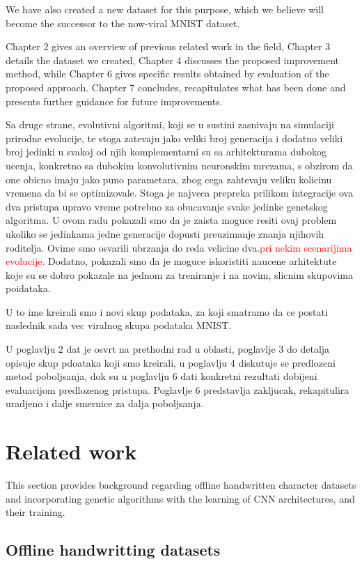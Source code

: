 \documentclass[eng]{simposium}
\begin{document}
We have also created a new dataset for this purpose, which we believe will become the successor to the now-viral MNIST dataset.

Chapter 2 gives an overview of previous related work in the field, Chapter 3 details the dataset we created,
Chapter 4 discusses the proposed improvement method, while Chapter 6 gives specific results obtained by evaluation of the proposed approach.
Chapter 7 concludes, recapitulates what has been done and presents further guidance for future improvements.

Sa druge strane, evolutivni algoritmi, koji se u sustini zasnivaju na simulaciji prirodne evolucije, te stoga zatevaju jako 
veliki broj generacija i dodatno veliki broj jedinki u svakoj od njih komplementarni su sa arhitekturama dubokog ucenja, konkretno 
sa dubokim konvolutivnim neuronskim mrezama, s obzirom da one obicno imaju jako puno parametara, zbog cega zahtevaju veliku 
kolicinu vremena da bi se optimizovale. Stoga je najveca prepreka prilikom integracije ova dva pristupa upravo vreme potrebno 
za obucavanje svake jedinke genetskog algoritma. U ovom radu pokazali smo da je zaista moguce resiti ovaj problem ukoliko se 
jedinkama jedne generacije dopusti preuzimanje znanja njihovih roditelja. Ovime smo osvarili ubrzanja do reda velicine dva.\textcolor{red}{pri 
nekim scenarijima evolucije.}  Dodatno, pokazali smo da je moguce iskoristiti naucene arhitektute koje su se dobro pokazale na jednom 
za treniranje i na novim, slicnim skupovima poidataka.

U to ime kreirali smo i novi skup podataka, za koji smatramo da ce postati naslednik sada vec viralnog skupa podataka MNIST.

U poglavlju 2 dat je osvrt na prethodni rad u oblasti, poglavlje 3 do detalja opisuje skup pdoataka koji smo kreirali, 
u poglavlju 4 diskutuje se predlozeni metod poboljsanja, dok su u poglavlju 6 dati konkretni rezultati dobijeni evaluacijom 
predlozenog pristupa. Poglavlje 6 predstavlja zakljucak, rekapitulira uradjeno i dalje smernice za dalja poboljsanja. 

\section{Related work}

This section provides background regarding offline handwritten character datasets and incorporating genetic algorithms 
with the learning of CNN architectures, and their training. 

\subsection{Offline handwritting datasets}
\end{document}
